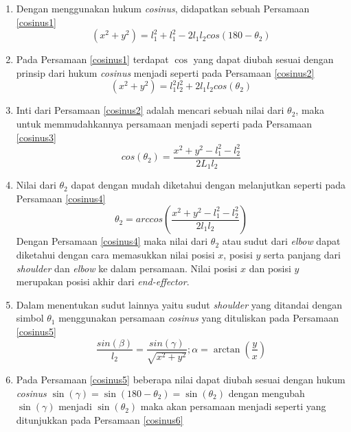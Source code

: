 \begin{enumerate}
	\item Dengan menggunakan hukum \textit{cosinus}, didapatkan sebuah Persamaan \ref{cosinus1}
	\begin{equation}
	(x^2+y^2)=l_{1}^2+l_{1}^2-2l_{1}l_{2}cos(180-\theta_{2})
	\label{cosinus1}
	\end{equation}
	\item Pada Persamaan \ref{cosinus1} terdapat $\cos$ yang dapat diubah sesuai dengan prinsip dari hukum \textit{cosinus} menjadi seperti pada Persamaan \ref{cosinus2}
	\begin{equation}
	(x^2+y^2)=l_{1}^2l_{2}^2+2l_{1}l_{2}cos(\theta_{2})
	\label{cosinus2}
	\end{equation}
	\item Inti dari Persamaan \ref{cosinus2} adalah mencari sebuah nilai dari $\theta_{2}$, maka untuk memmudahkannya persamaan menjadi seperti pada Persamaan \ref{cosinus3}
	\begin{equation}
	cos(\theta_{2})=\frac{x^2+y^2-l_{1}^2-l_{2}^2}{2L_{1}l_{2}}
	\label{cosinus3}
	\end{equation}
	\item Nilai dari $\theta_{2}$ dapat dengan mudah diketahui dengan melanjutkan seperti pada Persamaan \ref{cosinus4}
	\begin{equation}
	\theta_{2}=arccos(\frac{x^2+y^2-l_{1}^2-l_{2}^2}{2l_{1}l_{2}})
		\label{cosinus4}
	\end{equation}
	Dengan Persamaan \ref{cosinus4} maka nilai dari $\theta_{2}$ atau sudut dari \textit{elbow} dapat diketahui dengan cara memasukkan nilai posisi $x$, posisi $y$ serta panjang dari \textit{shoulder} dan \textit{elbow} ke dalam persamaan. Nilai posisi $x$ dan posisi $y$ merupakan posisi akhir dari \textit{end-effector}. 
	\item Dalam menentukan sudut lainnya yaitu sudut \textit{shoulder} yang ditandai dengan simbol $\theta_{1}$ menggunakan persamaan \textit{cosinus} yang dituliskan pada Persamaan \ref{cosinus5}
	\begin{equation}
	\frac{sin(\beta)}{l_{2}} = \frac{sin(\gamma)}{\sqrt{x^2+y^2}} ; \alpha=\arctan(\frac{y}{x})
	\label{cosinus5}
	\end{equation}
	\item Pada Persamaan \ref{cosinus5} beberapa nilai dapat diubah sesuai dengan hukum \textit{cosinus} $\sin(\gamma)=\sin(180-\theta_{2})=\sin(\theta_{2})$ dengan mengubah $\sin(\gamma)$ menjadi $\sin(\theta_{2})$ maka akan persamaan menjadi seperti yang ditunjukkan pada Persamaan \ref{cosinus6}

\end{enumerate}
